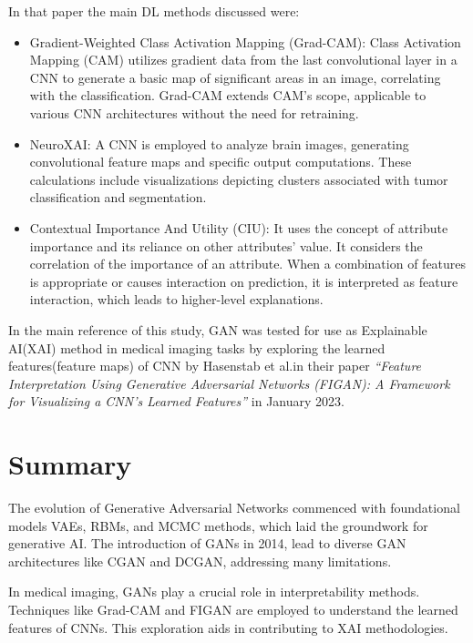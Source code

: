 In that paper \cite{XAI} the main DL methods discussed were:

\begin{itemize}
    \item Gradient-Weighted Class Activation Mapping (Grad-CAM): Class Activation Mapping (CAM) utilizes gradient data from the last convolutional layer in a CNN to generate a basic map of significant areas in an image, correlating with the classification. Grad-CAM extends CAM's scope, applicable to various CNN architectures without the need for retraining.\cite{Grad_CAM}
    \item NeuroXAI: A CNN is employed to analyze brain images, generating convolutional feature maps and specific output computations. These calculations include visualizations depicting clusters associated with tumor classification and segmentation.
    \item  Contextual Importance And Utility (CIU): It uses the concept of attribute importance and its reliance on other attributes’ value. It considers the correlation of the importance of an attribute. When a combination of features is appropriate or causes interaction on prediction, it is interpreted as feature interaction, which leads to higher-level explanations.
\end{itemize}

\noindent
In the main reference of this study, GAN was tested for use as Explainable AI(XAI) method in medical imaging tasks by exploring the learned features(feature maps) of CNN by Hasenstab et al.in their paper \textit{“Feature Interpretation Using Generative Adversarial Networks (FIGAN): A Framework for Visualizing a CNN’s Learned Features”}\cite{FIGAN} in January 2023.

\section{Summary}

\noindent
The evolution of Generative Adversarial Networks commenced with foundational models VAEs, RBMs, and MCMC methods, which laid the groundwork for generative AI. The introduction of GANs in 2014, lead to diverse GAN architectures like CGAN and DCGAN, addressing many limitations.

\noindent
In medical imaging, GANs play a crucial role in interpretability methods. Techniques like Grad-CAM and FIGAN are employed to understand the learned features of CNNs. This exploration aids in contributing to XAI methodologies.